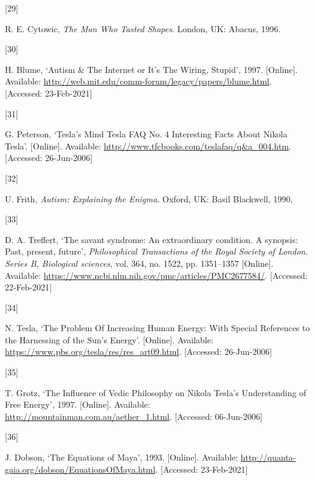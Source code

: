 \documentclass[
  12pt,
  british,
  a4paper,
  rgb,
  dvipsnames,
  svgnames,
  hyphens]{article}
\newlength{\cslhangindent}
\newlength{\csllabelwidth}
\newenvironment{CSLReferences}[2] %
 {%
  \setlength{\parindent}{0pt}
  \ifodd #1 \everypar{\setlength{\hangindent}{\cslhangindent}}\ignorespaces\fi
  \ifnum #2 > 0
  \setlength{\parskip}{#2\baselineskip}
  \fi
 }%
 {}
\newcommand{\CSLLeftMargin}[1]{\parbox[t]{\csllabelwidth}{#1}}
\newcommand{\CSLRightInline}[1]{\parbox[t]{\linewidth - \csllabelwidth}{#1}\break}
\begin{document}
\begin{CSLReferences}{0}{0}
\leavevmode{}%
\CSLLeftMargin{{[}29{]} }
\CSLRightInline{R. E. Cytowic, \emph{{The Man Who Tasted Shapes}}.
London, UK: Abacus, 1996. }

\leavevmode{}%
\CSLLeftMargin{{[}30{]} }
\CSLRightInline{H. Blume, {`{Autism \& The Internet or It's The Wiring,
Stupid}'}, 1997. {[}Online{]}. Available:
\url{http://web.mit.edu/comm-forum/legacy/papers/blume.html}.
{[}Accessed: 23-Feb-2021{]}}

\leavevmode{}%
\CSLLeftMargin{{[}31{]} }
\CSLRightInline{G. Peterson, {`{Tesla's Mind \textbar{} Tesla FAQ No. 4
\textbar{} Interesting Facts About Nikola Tesla}'}. {[}Online{]}.
Available: \url{http://www.tfcbooks.com/teslafaq/q\&a_004.htm}.
{[}Accessed: 26-Jun-2006{]}}

\leavevmode{}%
\CSLLeftMargin{{[}32{]} }
\CSLRightInline{U. Frith, \emph{{Autism: Explaining the Enigma}}.
Oxford, UK: Basil Blackwell, 1990. }

\leavevmode{}%
\CSLLeftMargin{{[}33{]} }
\CSLRightInline{D. A. Treffert, {`The savant syndrome: An extraordinary
condition. A synopsis: Past, present, future'}, \emph{Philosophical
Transactions of the Royal Society of London. Series B, Biological
sciences}, vol. 364, no. 1522, pp. 1351--1357 {[}Online{]}. Available:
\url{https://www.ncbi.nlm.nih.gov/pmc/articles/PMC2677584/}.
{[}Accessed: 22-Feb-2021{]}}

\leavevmode{}%
\CSLLeftMargin{{[}34{]} }
\CSLRightInline{N. Tesla, {`{The Problem Of Increasing Human Energy:
With Special References to the Harnessing of the Sun's Energy}'}.
{[}Online{]}. Available:
\url{https://www.pbs.org/tesla/res/res_art09.html}. {[}Accessed:
26-Jun-2006{]}}

\leavevmode{}%
\CSLLeftMargin{{[}35{]} }
\CSLRightInline{T. Grotz, {`{The Influence of Vedic Philosophy on Nikola
Tesla's Understanding of Free Energy}'}, 1997. {[}Online{]}. Available:
\url{http://mountainman.com.au/aether_1.html}. {[}Accessed:
06-Jun-2006{]}}

\leavevmode{}%
\CSLLeftMargin{{[}36{]} }
\CSLRightInline{J. Dobson, {`{The Equations of Maya}'}, 1993.
{[}Online{]}. Available:
\url{http://quanta-gaia.org/dobson/EquationsOfMaya.html}. {[}Accessed:
23-Feb-2021{]}}


\end{CSLReferences}
\end{document}
